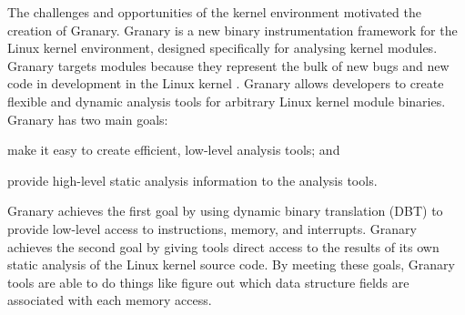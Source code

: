 \documentclass[preprint]{sigplanconf}
\begin{document}

The challenges and opportunities of the kernel environment motivated the creation of Granary. Granary is a new binary instrumentation framework for the Linux kernel environment, designed specifically for analysing kernel modules. Granary targets modules because they represent the bulk of new bugs and new code in development in the Linux kernel \cite{FaultsInLinux}. Granary allows developers to create flexible and dynamic analysis tools for arbitrary Linux kernel module binaries. Granary has two main goals: \begin{inparaenum}[i)]
	\item make it easy to create efficient, low-level analysis tools; and
	\item provide high-level static analysis information to the analysis tools.
\end{inparaenum} Granary achieves the first goal by using dynamic binary translation (DBT) to provide low-level access to instructions, memory, and interrupts. Granary achieves the second goal by giving tools direct access to the results of its own static analysis of the Linux kernel source code. By meeting these goals, Granary tools are able to do things like  figure out which data structure fields are associated with each memory access.

\end{document}
